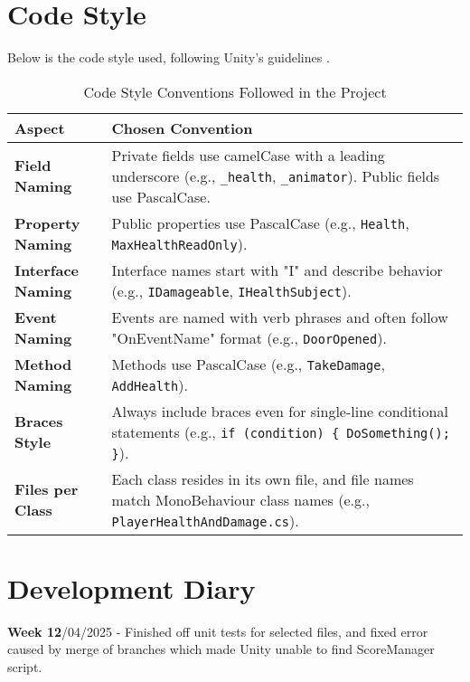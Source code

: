 \documentclass[10pt]{final_report}
\begin{document}
\section{Code Style}
Below is the code style used, following Unity's guidelines \cite{unity_2022_codestyle}.
\begin{table}[H]
\centering
\begin{tabular}{|p{4cm}|p{8cm}|}
\hline
\textbf{Aspect}              & \textbf{Chosen Convention}                                                                                   \\ \hline
\textbf{Field Naming}        & Private fields use camelCase with a leading underscore (e.g., \texttt{\_health}, \texttt{\_animator}). Public fields use PascalCase. \\ \hline
\textbf{Property Naming}     & Public properties use PascalCase (e.g., \texttt{Health}, \texttt{MaxHealthReadOnly}).                         \\ \hline
\textbf{Interface Naming}    & Interface names start with "I" and describe behavior (e.g., \texttt{IDamageable}, \texttt{IHealthSubject}).   \\ \hline
\textbf{Event Naming}        & Events are named with verb phrases and often follow "OnEventName" format (e.g., \texttt{DoorOpened}).         \\ \hline
\textbf{Method Naming}       & Methods use  PascalCase (e.g., \texttt{TakeDamage}, \texttt{AddHealth}).                    \\ \hline
\textbf{Braces Style}        & Always include braces even for single-line conditional statements (e.g., \texttt{if (condition) \{ DoSomething(); \}}). \\ \hline
\textbf{Files per Class}     & Each class resides in its own file, and file names match MonoBehaviour class names (e.g., \texttt{PlayerHealthAndDamage.cs}). \\ \hline
\end{tabular}
\caption{Code Style Conventions Followed in the Project}
\label{tab:codestyle}
\end{table}

\section{Development Diary}
\textbf{Week 12}/04/2025
\newline- Finished off unit tests for selected files, and fixed error caused by merge of branches which made Unity unable to find ScoreManager script.
\end{document}

